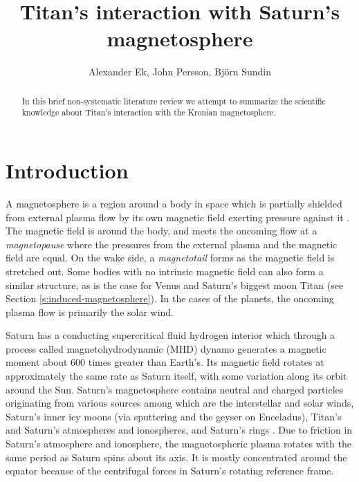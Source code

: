 \documentclass[12pt, parskip=full*, abstract]{scrartcl}
\title{Titan's interaction with Saturn's magnetosphere}
\author{Alexander Ek, John Persson, Björn Sundin}
\begin{document}
\maketitle
\vspace{5mm}
\begin{abstract}
	In this brief non-systematic literature review we attempt to summarize the scientific knowledge about Titan's interaction with the Kronian magnetosphere.
\end{abstract}

\newpage
\tableofcontents
\newpage

\section{Introduction}

A magnetosphere is a region around a body in space which is partially shielded from external plasma flow by its own magnetic field exerting pressure against it \parencite{encyclopedia-magnetospheres}. The magnetic field is  around the body, and meets the oncoming flow at a \textit{magnetopause} where the pressures from the external plasma and the magnetic field are equal. On the wake side, a \textit{magnetotail} forms as the magnetic field is stretched out. Some bodies with no intrinsic magnetic field can also form a similar structure, as is the case for Venus and Saturn's biggest moon Titan (see Section \ref{s:induced-magnetosphere}). In the cases of the planets, the oncoming plasma flow is primarily the solar wind. 

Saturn has a conducting supercritical fluid hydrogen interior which through a process called magnetohydrodynamic (MHD) dynamo generates a magnetic moment about 600 times greater than Earth's. Its magnetic field rotates at approximately the same rate as Saturn itself, with some variation along its orbit around the Sun. Saturn's magnetosphere contains neutral and charged particles originating from various sources among which are the interstellar and solar winds, Saturn's inner icy moons (via sputtering and the geyser on Enceladus), Titan's and Saturn's atmospheres and ionospheres, and Saturn's rings \parencite{solar-system-magnetospheres}. Due to friction in Saturn's atmosphere and ionosphere, the magnetospheric plasma rotates with the same period as Saturn spins about its axis. It is mostly concentrated around the equator because of the centrifugal forces in Saturn's rotating reference frame.
\end{document}
